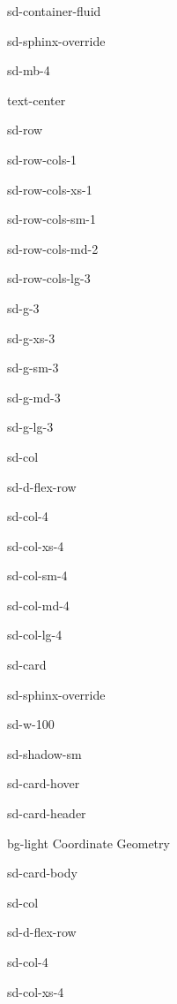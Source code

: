 \documentclass[letterpaper,10pt,english]{jupyterBook}
\let\sphinxpxdimen\pdfpxdimen\else\newdimen\sphinxpxdimen
\begin{document}
\begin{sphinxuseclass}{sd-container-fluid}
\begin{sphinxuseclass}{sd-sphinx-override}
\begin{sphinxuseclass}{sd-mb-4}
\begin{sphinxuseclass}{text-center}
\begin{sphinxuseclass}{sd-row}
\begin{sphinxuseclass}{sd-row-cols-1}
\begin{sphinxuseclass}{sd-row-cols-xs-1}
\begin{sphinxuseclass}{sd-row-cols-sm-1}
\begin{sphinxuseclass}{sd-row-cols-md-2}
\begin{sphinxuseclass}{sd-row-cols-lg-3}
\begin{sphinxuseclass}{sd-g-3}
\begin{sphinxuseclass}{sd-g-xs-3}
\begin{sphinxuseclass}{sd-g-sm-3}
\begin{sphinxuseclass}{sd-g-md-3}
\begin{sphinxuseclass}{sd-g-lg-3}
\begin{sphinxuseclass}{sd-col}
\begin{sphinxuseclass}{sd-d-flex-row}
\begin{sphinxuseclass}{sd-col-4}
\begin{sphinxuseclass}{sd-col-xs-4}
\begin{sphinxuseclass}{sd-col-sm-4}
\begin{sphinxuseclass}{sd-col-md-4}
\begin{sphinxuseclass}{sd-col-lg-4}
\begin{sphinxuseclass}{sd-card}
\begin{sphinxuseclass}{sd-sphinx-override}
\begin{sphinxuseclass}{sd-w-100}
\begin{sphinxuseclass}{sd-shadow-sm}
\begin{sphinxuseclass}{sd-card-hover}
\begin{sphinxuseclass}{sd-card-header}
\begin{sphinxuseclass}{bg-light}
\sphinxAtStartPar
Co\sphinxhyphen{}ordinate Geometry

\end{sphinxuseclass}
\end{sphinxuseclass}
\begin{sphinxuseclass}{sd-card-body}
\begin{figure}[htbp]
\centering

\noindent\sphinxincludegraphics[width=250\sphinxpxdimen]{{4_line_line_distance}.svg}
\end{figure}

\end{sphinxuseclass}{\hyperref[\detokenize{_pages/4.0_Coordinate_geometry::doc}]{}}
\end{sphinxuseclass}
\end{sphinxuseclass}
\end{sphinxuseclass}
\end{sphinxuseclass}
\end{sphinxuseclass}
\end{sphinxuseclass}
\end{sphinxuseclass}
\end{sphinxuseclass}
\end{sphinxuseclass}
\end{sphinxuseclass}
\end{sphinxuseclass}
\end{sphinxuseclass}
\begin{sphinxuseclass}{sd-col}
\begin{sphinxuseclass}{sd-d-flex-row}
\begin{sphinxuseclass}{sd-col-4}
\begin{sphinxuseclass}{sd-col-xs-4}

\end{sphinxuseclass}
\end{sphinxuseclass}
\end{sphinxuseclass}
\end{sphinxuseclass}
\end{sphinxuseclass}
\end{sphinxuseclass}
\end{sphinxuseclass}
\end{sphinxuseclass}
\end{sphinxuseclass}
\end{sphinxuseclass}
\end{sphinxuseclass}
\end{sphinxuseclass}
\end{sphinxuseclass}
\end{sphinxuseclass}
\end{sphinxuseclass}
\end{sphinxuseclass}
\end{sphinxuseclass}
\end{sphinxuseclass}
\end{sphinxuseclass}
\end{document}
